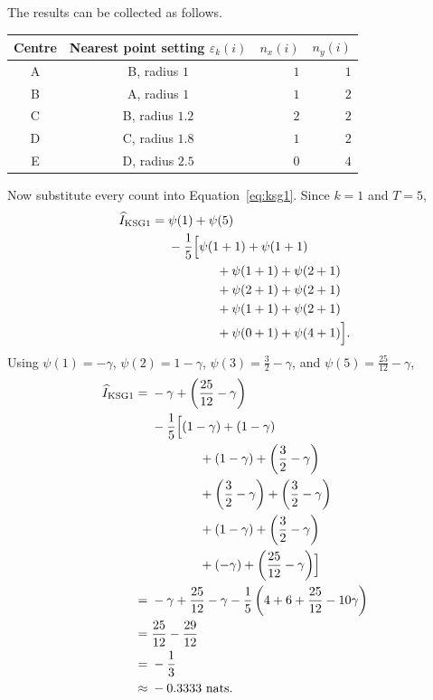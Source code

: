 \documentclass[11pt,letterpaper,oneside]{report}
\newcommand{\epsk}{\varepsilon_k}
\begin{document}
The results can be collected as follows.
\begin{center}
\begin{tabular}{c|c|rr}
\toprule
Centre & Nearest point setting $\epsk(i)$ & $n_x(i)$ & $n_y(i)$\\
\midrule
A & B, radius $1$ & $1$ & $1$\\
B & A, radius $1$ & $1$ & $2$\\
C & B, radius $1.2$ & $2$ & $2$\\
D & C, radius $1.8$ & $1$ & $2$\\
E & D, radius $2.5$ & $0$ & $4$\\
\bottomrule
\end{tabular}
\end{center}

Now substitute every count into Equation~\ref{eq:ksg1}. Since $k=1$ and $T=5$,
\begin{align*}
\widehat I_{\mathrm{KSG1}}
={}&\psi(1)+\psi(5)\\
&-\frac{1}{5}\Bigl[
  \psi(1+1)+\psi(1+1)\\
&\hspace{3.8em}+\psi(1+1)+\psi(2+1)\\
&\hspace{3.8em}+\psi(2+1)+\psi(2+1)\\
&\hspace{3.8em}+\psi(1+1)+\psi(2+1)\\
&\hspace{3.8em}+\psi(0+1)+\psi(4+1)\Bigr].
\end{align*}
Using $\psi(1)=-\gamma$, $\psi(2)=1-\gamma$, $\psi(3)=\frac{3}{2}-\gamma$, and $\psi(5)=\frac{25}{12}-\gamma$,
\begin{align*}
\widehat I_{\mathrm{KSG1}}
={}&-\gamma+\left(\frac{25}{12}-\gamma\right)\\
&-\frac{1}{5}\Bigl[
 (1-\gamma)+(1-\gamma)\\
&\hspace{3.8em}+(1-\gamma)+\left(\frac{3}{2}-\gamma\right)\\
&\hspace{3.8em}+\left(\frac{3}{2}-\gamma\right)+\left(\frac{3}{2}-\gamma\right)\\
&\hspace{3.8em}+(1-\gamma)+\left(\frac{3}{2}-\gamma\right)\\
&\hspace{3.8em}+(-\gamma)+\left(\frac{25}{12}-\gamma\right)\Bigr]\\
={}&-\gamma+\frac{25}{12}-\gamma
 -\frac{1}{5}\left(4+6+\frac{25}{12}-10\gamma\right)\\
={}&\frac{25}{12}-\frac{29}{12}\\
={}&-\frac{1}{3}\\
\approx{}&-0.3333\text{ nats}.
\end{align*}
\end{document}
